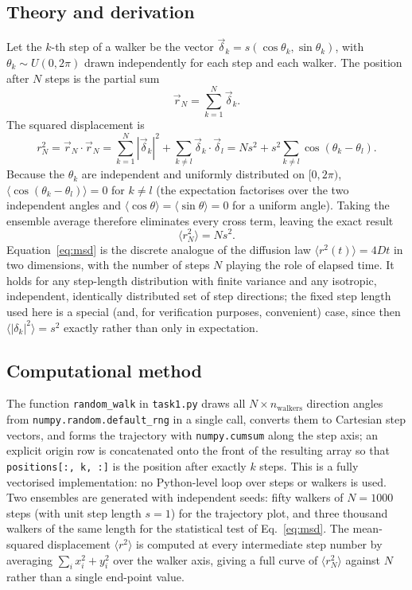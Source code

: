 \documentclass[11pt]{article}
\begin{document}
\subsection{Theory and derivation}
Let the $k$-th step of a walker be the vector $\vec{\delta}_k = s(\cos\theta_k, \sin\theta_k)$, with $\theta_k \sim U(0, 2\pi)$ drawn independently for each step and each walker. The position after $N$ steps is the partial sum
\begin{equation}
\vec{r}_N = \sum_{k=1}^{N} \vec{\delta}_k .
\end{equation}
The squared displacement is
\begin{equation}
r_N^2 = \vec{r}_N \cdot \vec{r}_N = \sum_{k=1}^N |\vec\delta_k|^2 + \sum_{k \ne l} \vec\delta_k \cdot \vec\delta_l
= N s^2 + s^2\sum_{k\ne l}\cos(\theta_k - \theta_l).
\end{equation}
Because the $\theta_k$ are independent and uniformly distributed on $[0,2\pi)$, $\langle \cos(\theta_k-\theta_l)\rangle = 0$ for $k \ne l$ (the expectation factorises over the two independent angles and $\langle\cos\theta\rangle=\langle\sin\theta\rangle=0$ for a uniform angle). Taking the ensemble average therefore eliminates every cross term, leaving the exact result
\begin{equation}
\label{eq:msd}
\langle r_N^2 \rangle = N s^2 .
\end{equation}
Equation~\eqref{eq:msd} is the discrete analogue of the diffusion law $\langle r^2(t)\rangle = 4Dt$ in two dimensions, with the number of steps $N$ playing the role of elapsed time. It holds for any step-length distribution with finite variance and any isotropic, independent, identically distributed set of step directions; the fixed step length used here is a special (and, for verification purposes, convenient) case, since then $\langle |\delta_k|^2\rangle = s^2$ exactly rather than only in expectation.

\subsection{Computational method}
The function \texttt{random\_walk} in \texttt{task1.py} draws all $N \times n_\text{walkers}$ direction angles from \texttt{numpy.random.default\_rng} in a single call, converts them to Cartesian step vectors, and forms the trajectory with \texttt{numpy.cumsum} along the step axis; an explicit origin row is concatenated onto the front of the resulting array so that \texttt{positions[:, k, :]} is the position after exactly $k$ steps. This is a fully vectorised implementation: no Python-level loop over steps or walkers is used. Two ensembles are generated with independent seeds: fifty walkers of $N=1000$ steps (with unit step length $s=1$) for the trajectory plot, and three thousand walkers of the same length for the statistical test of Eq.~\eqref{eq:msd}. The mean-squared displacement $\langle r^2\rangle$ is computed at every intermediate step number by averaging $\sum_i x_i^2+y_i^2$ over the walker axis, giving a full curve of $\langle r_N^2\rangle$ against $N$ rather than a single end-point value.
\end{document}
